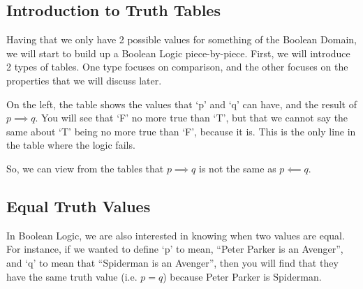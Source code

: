 \subsection{Introduction to Truth Tables}
Having that we only have 2 possible values for something of the Boolean Domain, we will start to build up a Boolean Logic piece-by-piece. First, we will introduce 2 types of tables. One type focuses on comparison, and the other focuses on the properties that we will discuss later.

\begin{table}[ht]
\centering
{}
\quad
{}
\caption{Tables for Describing Logical Implication}
\end{table}

On the left, the table shows the values that `p' and `q' can have, and the result of $p \implies q$. You will see that `F' no more true than `T', but that we cannot say the same about `T' being no more true than `F', because it is. This is the only line in the table where the logic fails.

So, we can view from the tables that $p \implies q$ is not the same as $p \impliedby q$.

\subsection{Equal Truth Values}
In Boolean Logic, we are also interested in knowing when two values are equal. For instance, if we wanted to define `p' to mean, ``Peter Parker is an Avenger'', and `q' to mean that ``Spiderman is an Avenger'', then you will find that they have the same truth value (i.e. $p = q$) because Peter Parker is Spiderman.


